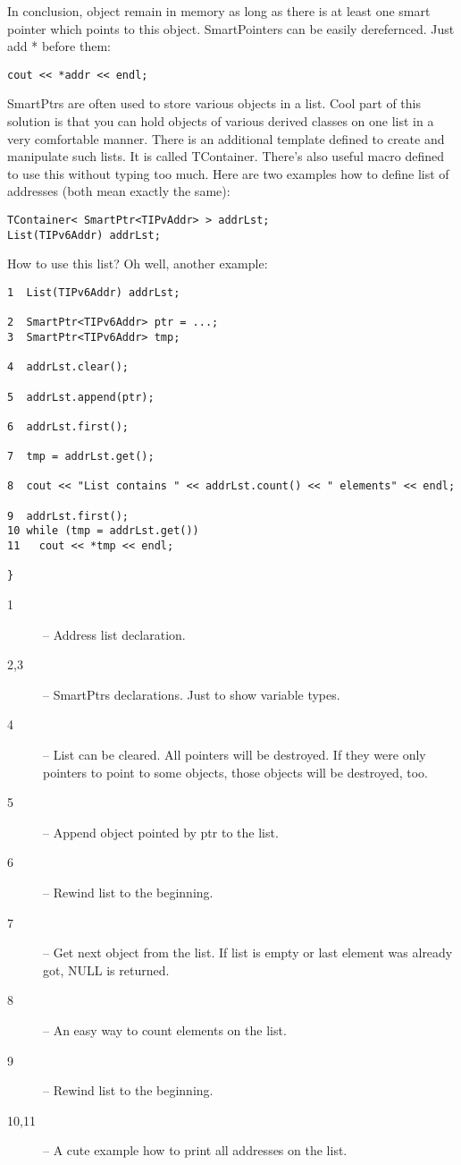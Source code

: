 In conclusion, object remain in memory as long as there is at least
one smart pointer which points to this object. SmartPointers can be
easily derefernced. Just add * before them:
\begin{verbatim}
cout << *addr << endl;
\end{verbatim}

SmartPtrs are often used to store various objects in a list. Cool part
of this solution is that you can hold objects of various derived
classes on one list in a very comfortable manner. There is an
additional template defined to create and manipulate such lists. It is
called TContainer. There's also useful macro defined to use this
without typing too much. Here are two examples how to define list of
addresses (both mean exactly the same):
\begin{verbatim}
TContainer< SmartPtr<TIPvAddr> > addrLst;
List(TIPv6Addr) addrLst;
\end{verbatim}

How to use this list? Oh well, another example:
\begin{verbatim}
1  List(TIPv6Addr) addrLst;

2  SmartPtr<TIPv6Addr> ptr = ...;
3  SmartPtr<TIPv6Addr> tmp;

4  addrLst.clear();

5  addrLst.append(ptr);

6  addrLst.first();

7  tmp = addrLst.get();

8  cout << "List contains " << addrLst.count() << " elements" << endl;

9  addrLst.first();
10 while (tmp = addrLst.get()) 
11   cout << *tmp << endl;

}
\end{verbatim}

\begin{description}
\item[1] -- Address list declaration.
\item[2,3] -- SmartPtrs declarations. Just to show variable types.
\item[4] -- List can be cleared. All pointers will be destroyed. If
  they were only pointers to point to some objects, those objects will
  be destroyed, too.
\item[5] -- Append object pointed by ptr to the list.
\item[6] -- Rewind list to the beginning.
\item[7] -- Get next object from the list. If list is empty or last
  element was already got, NULL is returned.
\item[8] -- An easy way to count elements on the list.
\item[9] -- Rewind list to the beginning.
\item[10,11] -- A cute example how to print all addresses on the list.
\end{description}

